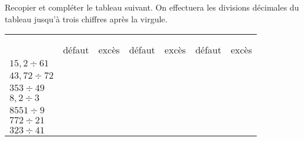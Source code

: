 Recopier et compléter le tableau suivant. On effectuera les
divisions décimales du tableau jusqu'à trois chiffres après la
virgule.

\begin{center}
\begin{tabularx}{\textwidth}{*{7}{|>{\centering}X}|}
 
       &  &  &  \tabularnewline
{}
       &  &  &  \tabularnewline
       &     défaut &      excès
&     défaut &      excès &     défaut &      excès
       \tabularnewline \hline
       $15,2 \div 61$ &            &            &            & & &
       \tabularnewline \hline
       $43,72 \div 72$ &            &            & & &            &
       \tabularnewline \hline
       $353 \div 49$ &            &            &            & &            &
       \tabularnewline \hline
       $8,2 \div 3$ &            &            &            &
       & &            \tabularnewline \hline
       $8551 \div 9$ &            &            &            & & &
       \tabularnewline \hline
       $772 \div 21$ &            &            &            & &            &
       \tabularnewline \hline
       $323 \div 41$ &            &            &            & &            &            \tabularnewline
       \hline
\end{tabularx}
\end{center}